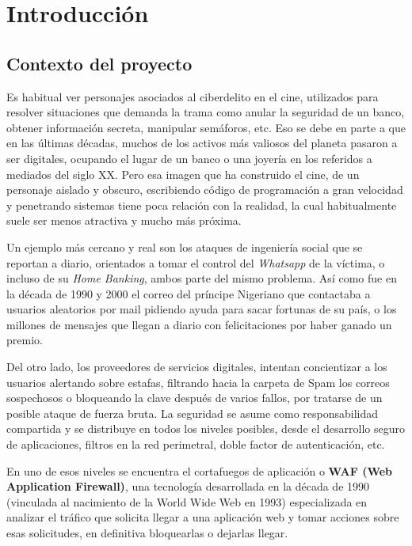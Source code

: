 \documentclass[12pt, a4paper]{article}
\begin{document}
\newpage
\tableofcontents
\newpage




\section{Introducción}

\subsection{Contexto del proyecto}

\vspace{0.2cm}
Es habitual ver personajes asociados al ciberdelito en el cine, utilizados para resolver situaciones que demanda la trama como anular la seguridad de un banco, obtener información secreta, manipular semáforos, etc. Eso se debe en parte a que en las últimas décadas, muchos de los activos más valiosos del planeta pasaron a ser digitales, ocupando el lugar de un banco o una joyería en los referidos a mediados del siglo XX. Pero esa imagen que ha construido el cine, de un personaje aislado y obscuro, escribiendo código de programación a gran velocidad y penetrando sistemas tiene poca relación con la realidad, la cual habitualmente suele ser menos atractiva y mucho más próxima.

Un ejemplo más cercano y real son los ataques de ingeniería social que se reportan a diario, orientados a tomar el control del \textit{Whatsapp} de la víctima, o incluso de su \textit{Home Banking}, ambos parte del mismo problema. Así como fue en la década de 1990 y 2000 el correo del príncipe Nigeriano que contactaba a usuarios aleatorios por mail pidiendo ayuda para sacar fortunas de su país, o los millones de mensajes que llegan a diario con felicitaciones por haber ganado un premio.

Del otro lado, los proveedores de servicios digitales, intentan concientizar a los usuarios alertando sobre estafas, filtrando hacia la carpeta de Spam los correos sospechosos o bloqueando la clave después de varios fallos, por tratarse de un posible ataque de fuerza bruta. La seguridad se asume como responsabilidad compartida y se distribuye en todos los niveles posibles, desde el desarrollo seguro de aplicaciones, filtros en la red perimetral, doble factor de autenticación, etc.

En uno de esos niveles se encuentra el cortafuegos de aplicación o \textbf{WAF (Web Application Firewall)}, una tecnología desarrollada en la década de 1990 (vinculada al nacimiento de la World Wide Web en 1993) especializada en analizar el tráfico que solicita llegar a una aplicación web y tomar acciones sobre esas solicitudes, en definitiva bloquearlas o dejarlas llegar.
\end{document}
